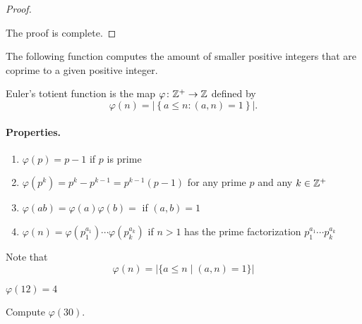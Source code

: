 \documentclass[11pt,a4paper]{article}
\begin{document}
\begin{proof}
\begin{enumerate}[left=2cm]


\end{enumerate}
The proof is complete.
\end{proof}

The following function  computes the amount of smaller positive integers that are coprime to a given positive integer.
\begin{defi}%
    Euler's totient function is the map  \(\varphi \colon \mathbb{Z}^+\to \mathbb{Z}\) defined by 
    \[\varphi(n) = |\left\{ a\leq n : (a,n) = 1 \right\}|.\]
\end{defi}

\paragraph{Properties.} 

\begin{enumerate}[label=(\roman*)]
    \item \(\varphi(p) = p-1\) if \(p\) is prime 
    \item \(\varphi(p^k) = p^k - p^{k-1} = p^{k-1}(p-1)\) for any prime \(p\) and any \(k\in \mathbb{Z}^+\)
    \item \(\varphi(ab) = \varphi(a)\varphi(b) = \) if \((a,b) = 1\)
    \item \(\varphi(n) = \varphi(p_1^{a_1})\cdots\varphi(p_k^{a_k})\) if \(n > 1\) has the prime factorization \(p_1^{a_1}\cdots p_k^{a_k}\)
\end{enumerate}

Note that \[\varphi(n)=\big|\{a \leq n \mid(a, n)=1\}\big|\]

\begin{exa}
    \(\varphi(12) = 4\)
\end{exa}

\begin{eje}
    Compute \(\varphi(30)\).
\end{eje}
\end{document}
